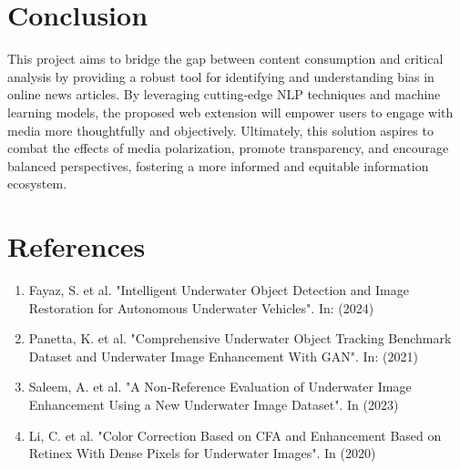 \documentclass{article}
\begin{document}
\section{Conclusion}
This project aims to bridge the gap between content consumption and critical analysis by providing a robust tool for identifying and understanding bias in online news articles. By leveraging cutting-edge NLP techniques and machine learning models, the proposed web extension will empower users to engage with media more thoughtfully and objectively. Ultimately, this solution aspires to combat the effects of media polarization, promote transparency, and encourage balanced perspectives, fostering a more informed and equitable information ecosystem.

\section*{References}
\begin{enumerate}
    \item Fayaz, S. et al. "Intelligent Underwater Object Detection and Image Restoration for Autonomous Underwater Vehicles". In: (2024)

    \item Panetta, K. et al. "Comprehensive Underwater Object Tracking Benchmark Dataset and Underwater Image Enhancement With GAN". In: (2021)

    \item Saleem, A. et al. "A Non-Reference Evaluation of Underwater Image Enhancement Using a New Underwater Image Dataset". In (2023)

    \item Li, C. et al. "Color Correction Based on CFA and Enhancement Based on Retinex With Dense Pixels for Underwater Images". In (2020)


\end{enumerate}
\end{document}
